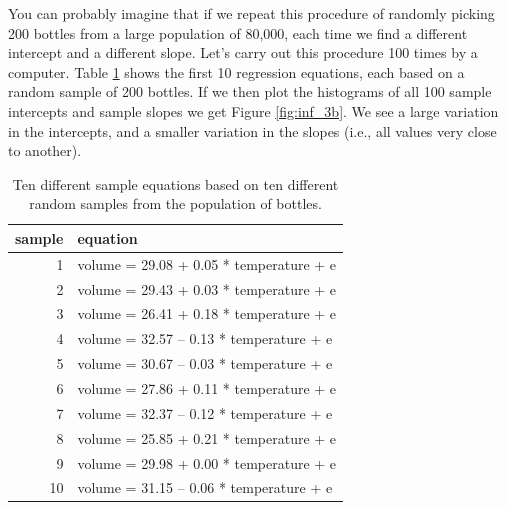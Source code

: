 \documentclass[]{report}\usepackage[]{graphicx}\usepackage[]{color}
\begin{document}
You can probably imagine that if we repeat this procedure of randomly picking 200 bottles from a large population of 80,000, each time we find a different intercept and a different slope. Let's carry out this procedure 100 times by a computer. Table \ref{tab:inf_3a} shows the first 10 regression equations, each based on a random sample of 200 bottles. If we then plot the histograms of all 100 sample intercepts and sample slopes we get Figure \ref{fig:inf_3b}. We see a large variation in the intercepts, and a smaller variation in the slopes (i.e., all values very close to another).




\begin{table}[ht]
\centering
\caption{Ten different sample equations based on ten different random samples from the population of bottles.} 
\label{tab:inf_3a}
\begin{tabular}{rl}
  \hline
sample & equation \\ 
  \hline
1 & volume =  29.08  +  0.05 * temperature + e \\ 
  2 & volume =  29.43  +  0.03 * temperature + e \\ 
  3 & volume =  26.41  +  0.18 * temperature + e \\ 
  4 & volume =  32.57  --  0.13 * temperature + e \\ 
  5 & volume =  30.67  --  0.03 * temperature + e \\ 
  6 & volume =  27.86  +  0.11 * temperature + e \\ 
  7 & volume =  32.37  --  0.12 * temperature + e \\ 
  8 & volume =  25.85  +  0.21 * temperature + e \\ 
  9 & volume =  29.98  +  0.00 * temperature + e \\ 
  10 & volume =  31.15  --  0.06 * temperature + e \\ 
   \hline
\end{tabular}
\end{table}
\end{document}
